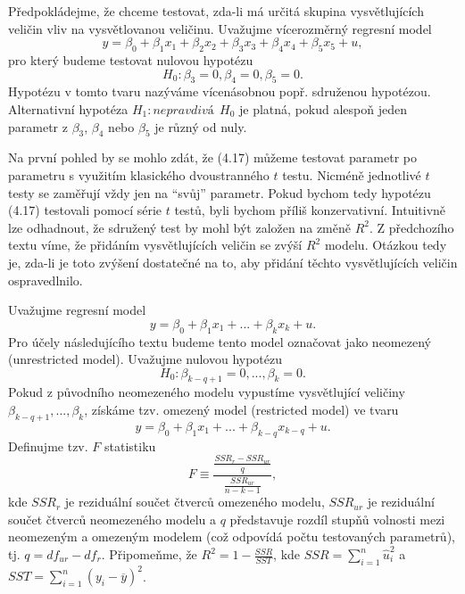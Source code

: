 Předpokládejme, že chceme testovat, zda-li má určitá skupina vysvětlujících veličin vliv na vysvětlovanou veličinu. Uvažujme 
vícerozměrný regresní model
\begin{equation}
y = \beta_0 + \beta_1 x_1 + \beta_2 x_2 + \beta_3 x_3 + \beta_4 x_4 + \beta_5 x_5 + u,
\end{equation}
pro který budeme testovat nulovou hypotézu
\begin{equation}
H_0: \beta_3 = 0, \beta_4 = 0, \beta_5 = 0.
\end{equation}
Hypotézu v tomto tvaru nazýváme vícenásobnou 
popř. sdruženou hypotézou. Alternativní hypotéza $H_1: \textit{nepravdivá} ~~ H_0$ je platná, pokud alespoň jeden parametr z $\beta_3$, $\beta_4$ nebo 
$\beta_5$ je různý od nuly.

Na první pohled by se mohlo zdát, že (4.17) můžeme testovat parametr po parametru s využitím klasického dvoustranného $t$ testu. Nicméně 
jednotlivé $t$ testy se zaměřují vždy jen na ``svůj'' parametr. Pokud bychom tedy hypotézu (4.17) testovali pomocí série $t$ testů, byli bychom příliš 
konzervativní. Intuitivně lze odhadnout, že sdružený test by mohl být založen na změně $R^2$. Z předchozího textu víme, že 
přidáním vysvětlujících veličin se zvýší $R^2$ modelu. Otázkou tedy je, zda-li je toto zvýšení dostatečné na to, aby přidání 
těchto vysvětlujících veličin ospravedlnilo.

Uvažujme regresní model
\begin{equation}
y = \beta_0 + \beta_1 x_1 + ... + \beta_k x_k + u.
\end{equation}
Pro účely následujícího textu budeme tento model označovat jako neomezený (unrestricted model). Uvažujme nulovou hypotézu
\begin{equation}
H_0: \beta_{k - q + 1} = 0, ..., \beta_k = 0.
\end{equation}
Pokud z původního neomezeného modelu vypustíme vysvětlující veličiny $\beta_{k - q + 1}, ..., \beta_k$, získáme tzv. omezený model 
(restricted model) ve tvaru
\begin{equation}
y = \beta_0 + \beta_1 x_1 + ... + \beta_{k - q}x_{k - q} + u.
\end{equation}
Definujme tzv. $F$ statistiku
\begin{equation}
F \equiv \frac{\frac{SSR_r - SSR_{ur}}{q}}{\frac{SSR_{ur}}{n - k - 1}},
\end{equation}
kde $SSR_r$ je reziduální součet čtverců omezeného modelu, $SSR_{ur}$ je reziduální součet čtverců neomezeného modelu a $q$ představuje 
rozdíl stupňů volnosti mezi neomezeným a omezeným modelem (což odpovídá počtu testovaných parametrů), tj. $q = df_{ur} - df_{r}$. Připomeňme, že 
$R^2 = 1 - \frac{SSR}{SST}$, kde $SSR = \sum_{i = 1}^n \hat{u}_i^2$ a $SST = \sum_{i = 1}^n (y_i - \overline{y})^2$.

